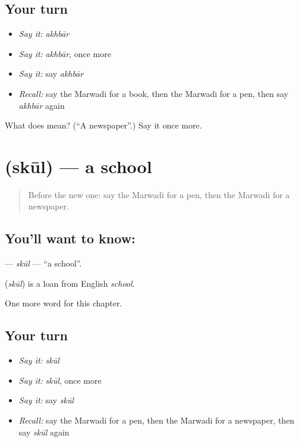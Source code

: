 \subsection*{Your turn}
\begin{itemize}
\raggedright
  \item \emph{Say it:} \emph{akhbār}
  \item \emph{Say it:} \emph{akhbār}, once more
  \item \emph{Say it:} say \emph{akhbār}
  \item \emph{Recall:} say the Marwadi for a book, then the Marwadi for a pen, then say \emph{akhbār} again
\end{itemize}

\begin{tcolorbox}[breakable,colback=teal!4,colframe=teal!35!black,title={Before you move on}]
What does  mean? (\textquotedblleft{}A newspaper\textquotedblright{}.) Say it once more.
\end{tcolorbox}
\section[\texorpdfstring{\mw{स्कूल} (skūl)}{स्कूल (skūl)}]{ (skūl) — a school}

\label{lesson:MW-C66-skul}



\begin{quote}
Before the new one: say the Marwadi for a pen, then the Marwadi for a newspaper.
\end{quote}

\subsection*{You'll want to know: }
\textbf{} — \emph{skūl} — \textquotedblleft{}a school\textquotedblright{}.

\begin{cousinweb}
\textbf{} (\emph{skūl}) is a loan from English \emph{school}.
\end{cousinweb}

\begin{grammarlens}[title={What you've built}]
One more word for this chapter.
\end{grammarlens}

\subsection*{Your turn}
\begin{itemize}
\raggedright
  \item \emph{Say it:} \emph{skūl}
  \item \emph{Say it:} \emph{skūl}, once more
  \item \emph{Say it:} say \emph{skūl}
  \item \emph{Recall:} say the Marwadi for a pen, then the Marwadi for a newspaper, then say \emph{skūl} again
\end{itemize}

